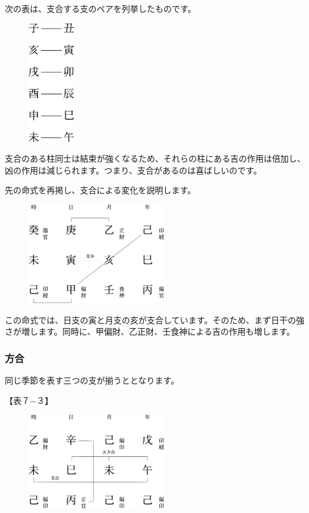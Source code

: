 \documentclass[a5paper,11pt,dvipdfmx]{tarticle}
\begin{document}
次の表は、支合する支のペアを列挙したものです。

\begin{figure}[h]
 \includegraphics[width=20mm,angle=90]{figs/table7-2.eps}
\end{figure}

支合のある柱同士は結束が強くなるため、それらの柱にある吉の作用は倍加し、凶の作用は減じられます。つまり、支合があるのは喜ばしいのです。

先の命式を再掲し、支合による変化を説明します。

\begin{figure}[h]
  \includegraphics[width=60mm,angle=90]{figs/figure7-2.eps}
\end{figure}

この命式では、日支の寅と月支の亥が支合しています。そのため、まず日干の強さが増します。同時に、甲偏財、乙正財、壬食神による吉の作用も増します。

\subsubsection*{方合}
同じ季節を表す三つの支が揃うととなります。

【表７−３】

\begin{figure}[h]
  \includegraphics[width=60mm,angle=90]{figs/figure7-3.eps}
\end{figure}
\end{document}
